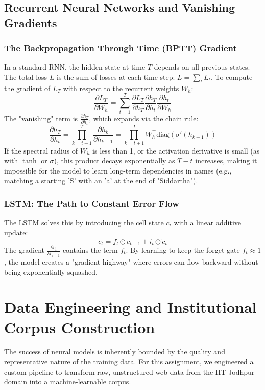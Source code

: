\documentclass[12pt,a4paper]{article}
\begin{document}
\subsection{Recurrent Neural Networks and Vanishing Gradients}

\subsubsection{The Backpropagation Through Time (BPTT) Gradient}
In a standard RNN, the hidden state at time $T$ depends on all previous states. The total loss $L$ is the sum of losses at each time step: $L = \sum_t L_t$. To compute the gradient of $L_T$ with respect to the recurrent weights $W_h$:
\begin{equation}
    \frac{\partial L_T}{\partial W_h} = \sum_{t=1}^T \frac{\partial L_T}{\partial h_T} \frac{\partial h_T}{\partial h_t} \frac{\partial h_t}{\partial W_h}
\end{equation}
The "vanishing" term is $\frac{\partial h_T}{\partial h_t}$, which expands via the chain rule:
\begin{equation}
    \frac{\partial h_T}{\partial h_t} = \prod_{k=t+1}^T \frac{\partial h_k}{\partial h_{k-1}} = \prod_{k=t+1}^T W_h^\top \text{diag}(\sigma'(h_{k-1}))
\end{equation}
If the spectral radius of $W_h$ is less than 1, or the activation derivative is small (as with $\tanh$ or $\sigma$), this product decays exponentially as $T-t$ increases, making it impossible for the model to learn long-term dependencies in names (e.g., matching a starting 'S' with an 'a' at the end of "Siddartha").

\subsubsection{LSTM: The Path to Constant Error Flow}
The LSTM solves this by introducing the cell state $c_t$ with a linear additive update:
\begin{equation}
    c_t = f_t \odot c_{t-1} + i_t \odot \tilde{c}_t
\end{equation}
The gradient $\frac{\partial c_t}{\partial c_{t-1}}$ contains the term $f_t$. By learning to keep the forget gate $f_t \approx 1$, the model creates a "gradient highway" where errors can flow backward without being exponentially squashed.

\section{Data Engineering and Institutional Corpus Construction}
The success of neural models is inherently bounded by the quality and representative nature of the training data. For this assignment, we engineered a custom pipeline to transform raw, unstructured web data from the IIT Jodhpur domain into a machine-learnable corpus.
\end{document}
